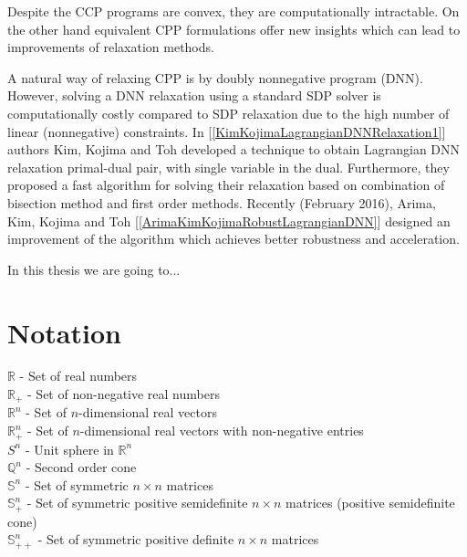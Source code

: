\documentclass[12pt]{book}
\theoremstyle{definition}
\begin{document}
Despite the CCP programs are convex, they are computationally intractable. On the other hand equivalent CPP formulations offer new insights which can lead to improvements of relaxation methods. 

A natural way of relaxing CPP is by doubly nonnegative program (DNN).
However, solving a DNN relaxation using a standard SDP solver is computationally costly compared to SDP relaxation due to the high number of linear (nonnegative) constraints. In [\ref{KimKojimaLagrangianDNNRelaxation1}] authors Kim, Kojima and Toh developed a technique to obtain Lagrangian DNN relaxation primal-dual pair, with single variable in the dual. Furthermore, they proposed a fast algorithm for solving their relaxation based on combination of bisection method and first order methods. Recently (February 2016), Arima, Kim, Kojima and Toh [\ref{ArimaKimKojimaRobustLagrangianDNN}] designed an improvement of the algorithm which achieves better robustness and acceleration. %

In this thesis we are going to...






\newpage
\section*{Notation}

$\mathbb{R}$ - Set of real numbers \\
$\mathbb{R}_+$ - Set of non-negative real numbers \\
$\mathbb{R}^n$ - Set of $n$-dimensional real vectors   \\
$\mathbb{R}^n_{+}$ -  Set of $n$-dimensional real vectors with non-negative entries  \\

$S^n$ - Unit sphere in $\mathbb{R}^n$ \\

$\mathbb{Q}^n$ - Second order cone \\

$\mathbb{S}^n$ - Set of symmetric $n\times n$ matrices \\
$\mathbb{S}^n_+$ - Set of symmetric positive semidefinite $n\times n$ matrices (positive semidefinite cone) \\
$\mathbb{S}^n_{++}$ - Set of symmetric positive definite $n\times n$ matrices \\
\end{document}
